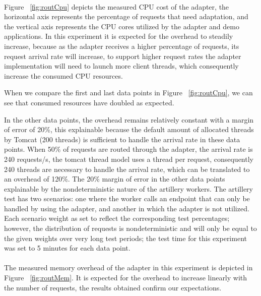 \paragraph{}

Figure ~\ref{fig:routCpu} depicts the measured CPU cost of the adapter, the horizontal axis represents the percentage of requests that need adaptation, and the vertical axis represents the
CPU cores utilized by the adapter and demo applications.
In this experiment it is expected for the overhead to steadily increase, because as the adapter receives a higher percentage of requests, its request arrival rate will increase, to support higher request rates
the adapter implementation will need to launch more client threads, which consequently increase the consumed CPU resources.

When we compare the first and last data points in Figure ~\ref{fig:routCpu}, we can see that consumed resources have doubled as expected.

In the other data points, the overhead remains relatively constant with a margin of error of 20\%,
this explainable because the default amount of allocated threads by Tomcat (200 threads) is sufficient to handle the arrival rate in these data points.
When 50\% of requests are routed through the adapter, the arrival rate is 240 requests/s, the tomcat thread model uses a thread per request,
consequently 240 threads are necessary to handle the arrival rate, which can be translated to an overhead of 120\%.
The 20\% margin of error in the other data points explainable by the nondeterministic nature of the artillery workers.
The artillery test has two scenarios: one where the worker calls an endpoint that can only be handled by using the adapter, and another in which the adapter is not utilized.
Each scenario weight as set to reflect the corresponding test percentages;
however, the distribution of requests is nondeterministic and will only be equal to the given weights over very long test periods;
the test time for this experiment was set to 5 minutes for each data point.

\paragraph{}

The measured memory overhead of the adapter in this experiment is depicted in Figure ~\ref{fig:routMem}.
It is expected for the overhead to increase linearly with the number of requests, the results obtained confirm our expectations.


